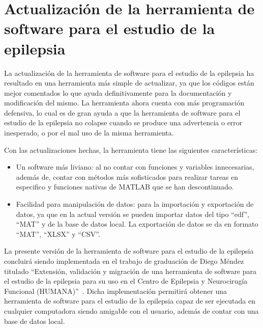 \chapter{Actualización de la herramienta de software para el estudio de la epilepsia}
La actualización de la herramienta de software para el estudio de la epilepsia ha resultado en una herramienta más simple de actualizar, ya que los códigos están mejor comentados lo que ayuda definitivamente para la documentación y modificación del mismo. La herramienta ahora cuenta con más programación defensiva, lo cual es de gran ayuda a que la herramienta de software para el estudio de la epilepsia no colapse cuando se produce una advertencia o error inesperado, o por el mal uso de la misma herramienta.

Con las actualizaciones hechas, la herramienta tiene las siguientes características:
\begin{itemize}
    \item Un software más liviano: al no contar con funciones y variables innecesarias, además de, contar con métodos más sofisticados para realizar tareas en especifico y funciones nativas de MATLAB que se han descontinuado. 
    \item Facilidad para manipulación de datos: para la importación y exportación de datos, ya que en la actual versión se pueden importar datos del tipo ``edf'', ``MAT'' y de la base de datos local. La exportación de datos se da en formato ``MAT'', ``XLSX'' y ``CSV''.
\end{itemize}

La presente versión de la herramienta de software para el estudio de la epilepsia concluirá siendo implementada en el trabajo de graduación de Diego Méndez titulado ``Extensión, validación y migración de una herramienta
de software para el estudio de la epilepsia para su uso en el Centro de Epilepsia y Neurocirugía Funcional (HUMANA)''~\cite{diego_2023}. Dicha implementación permitirá obtener una herramienta de software para el estudio de la epilepsia capaz de ser ejecutada en cualquier computadora siendo amigable con el usuario, además de contar con una base de datos local.  

